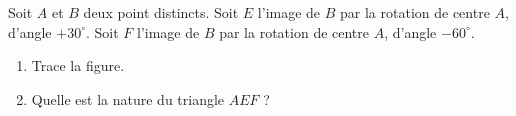 \begin{exercice}
Soit $A$ et $B$ deux point distincts. Soit $E$ l'image de $B$ par la rotation de centre $A$, d'angle $+ 30^\circ$. Soit $F$ l'image de $B$ par la rotation de centre $A$, d'angle $- 60^\circ$.
\begin{enumerate}
 \item Trace la figure.
 \item Quelle est la nature du triangle $AEF$ ?
 \end{enumerate}
\end{exercice}
